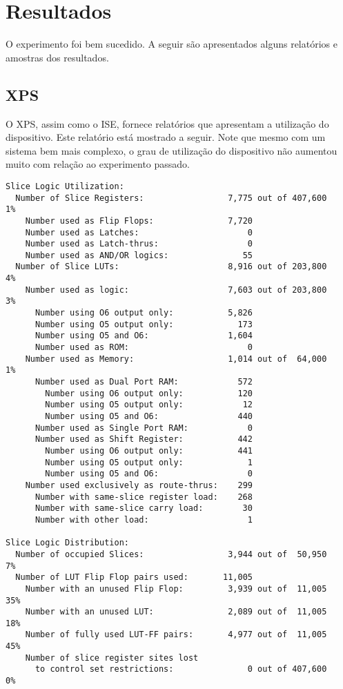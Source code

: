 \documentclass[11pt,a4paper,oneside]{book}
\begin{document}
\section{Resultados}
O experimento foi bem sucedido.
A seguir são apresentados alguns relatórios e amostras dos resultados.

\subsection{XPS}
O XPS, assim como o ISE, fornece relatórios que apresentam a utilização do dispositivo.
Este relatório está mostrado a seguir.
Note que mesmo com um sistema bem mais complexo, o grau de utilização do dispositivo não aumentou muito com relação ao experimento passado.
\begin{lstlisting}
Slice Logic Utilization:
  Number of Slice Registers:                 7,775 out of 407,600    1%
    Number used as Flip Flops:               7,720
    Number used as Latches:                      0
    Number used as Latch-thrus:                  0
    Number used as AND/OR logics:               55
  Number of Slice LUTs:                      8,916 out of 203,800    4%
    Number used as logic:                    7,603 out of 203,800    3%
      Number using O6 output only:           5,826
      Number using O5 output only:             173
      Number using O5 and O6:                1,604
      Number used as ROM:                        0
    Number used as Memory:                   1,014 out of  64,000    1%
      Number used as Dual Port RAM:            572
        Number using O6 output only:           120
        Number using O5 output only:            12
        Number using O5 and O6:                440
      Number used as Single Port RAM:            0
      Number used as Shift Register:           442
        Number using O6 output only:           441
        Number using O5 output only:             1
        Number using O5 and O6:                  0
    Number used exclusively as route-thrus:    299
      Number with same-slice register load:    268
      Number with same-slice carry load:        30
      Number with other load:                    1

Slice Logic Distribution:
  Number of occupied Slices:                 3,944 out of  50,950    7%
  Number of LUT Flip Flop pairs used:       11,005
    Number with an unused Flip Flop:         3,939 out of  11,005   35%
    Number with an unused LUT:               2,089 out of  11,005   18%
    Number of fully used LUT-FF pairs:       4,977 out of  11,005   45%
    Number of slice register sites lost
      to control set restrictions:               0 out of 407,600    0%
\end{lstlisting}
\end{document}
